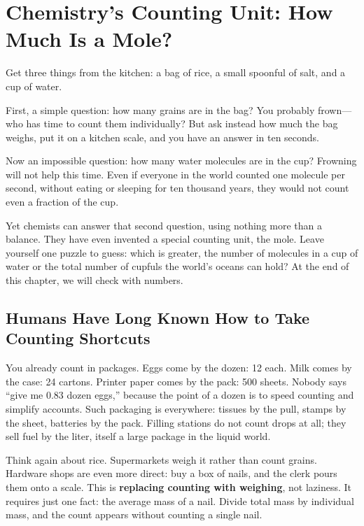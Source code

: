 \chapter{Chemistry's Counting Unit: How Much Is a Mole?}

\begin{kaichang}
Get three things from the kitchen: a bag of rice, a small spoonful of salt, and a cup of water.

First, a simple question: how many grains are in the bag? You probably frown---who has time to count them individually? But ask instead how much the bag weighs, put it on a kitchen scale, and you have an answer in ten seconds.

Now an impossible question: how many water molecules are in the cup? Frowning will not help this time. Even if everyone in the world counted one molecule per second, without eating or sleeping for ten thousand years, they would not count even a fraction of the cup.

Yet chemists can answer that second question, using nothing more than a balance. They have even invented a special counting unit, the mole. Leave yourself one puzzle to guess: which is greater, the number of molecules in a cup of water or the total number of cupfuls the world's oceans can hold? At the end of this chapter, we will check with numbers.
\end{kaichang}

\section{Humans Have Long Known How to Take Counting Shortcuts}

You already count in packages. Eggs come by the dozen: 12 each. Milk comes by the case: 24 cartons. Printer paper comes by the pack: 500 sheets. Nobody says ``give me 0.83 dozen eggs,'' because the point of a dozen is to speed counting and simplify accounts. Such packaging is everywhere: tissues by the pull, stamps by the sheet, batteries by the pack. Filling stations do not count drops at all; they sell fuel by the liter, itself a large package in the liquid world.

Think again about rice. Supermarkets weigh it rather than count grains. Hardware shops are even more direct: buy a box of nails, and the clerk pours them onto a scale. This is \textbf{replacing counting with weighing}, not laziness. It requires just one fact: the average mass of a nail. Divide total mass by individual mass, and the count appears without counting a single nail.

